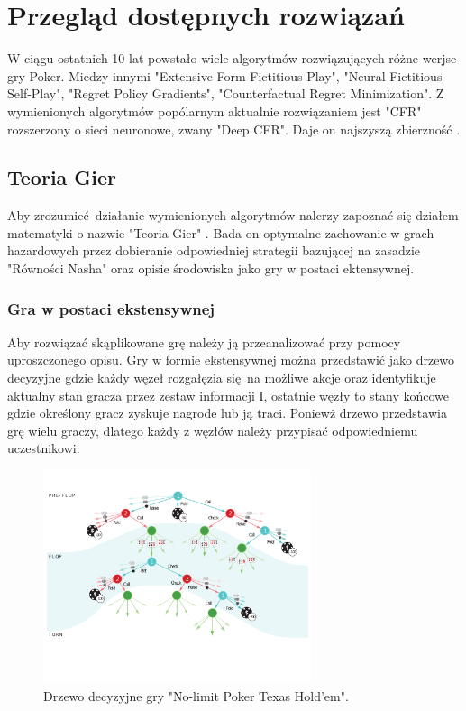 \documentclass[12pt,oneside,a4paper]{report}
\begin{document}
\section{Przegląd dostępnych rozwiązań}

W ciągu ostatnich 10 lat powstało wiele algorytmów rozwiązujących różne werjse gry Poker.
Miedzy innymi "Extensive-Form Fictitious Play", "Neural Fictitious Self-Play",
"Regret Policy Gradients", "Counterfactual Regret Minimization". 
Z wymienionych algorytmów popólarnym aktualnie rozwiązaniem jest "CFR" rozszerzony o sieci neuronowe,
zwany "Deep CFR". Daje on najszyszą zbierzność \cite{dcfr}.

\subsection{Teoria Gier}

Aby zrozumieć działanie wymienionych algorytmów nalerzy zapoznać się
działem matematyki o nazwie "Teoria Gier" \cite{gt}. Bada on optymalne zachowanie w grach
hazardowych przez dobieranie odpowiedniej strategii bazującej na zasadzie "Równości Nasha" oraz 
opisie środowiska jako gry w postaci ektensywnej.

\subsubsection{Gra w postaci ekstensywnej}

Aby rozwiązać skąplikowane grę należy ją przeanalizować przy pomocy uproszczonego opisu. Gry w
formie ekstensywnej można przedstawić jako drzewo decyzyjne gdzie każdy węzeł rozgałęzia się na
możliwe akcje oraz identyfikuje aktualny stan gracza przez zestaw informacji I,
ostatnie węzły to stany końcowe gdzie określony gracz zyskuje nagrode lub ją traci.
Poniewż drzewo przedstawia grę wielu graczy, dlatego każdy z węzłów należy przypisać odpowiedniemu
uczestnikowi. 

\begin{figure}[h!]
  \centering
  \includegraphics[width=0.7\textwidth]{./img/tree1.pdf}
  \caption{Drzewo decyzyjne gry "No-limit Poker Texas Hold'em". \cite{ds}}
\end{figure}
\end{document}
